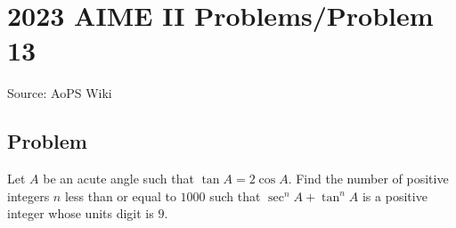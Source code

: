 \documentclass[12pt]{article}
\begin{document}
\section*{{2023 AIME II Problems/Problem 13}}
Source: AoPS Wiki

\subsection*{Problem}
Let $A$ be an acute angle such that $\tan A = 2 \cos A.$ Find the number of positive integers $n$ less than or equal to $1000$ such that $\sec^n A + \tan^n A$ is a positive integer whose units digit is $9.$
\end{document}
